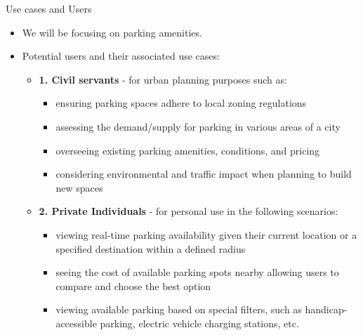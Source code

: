 \documentclass{beamer}
\begin{document}
\begin{frame}{Use cases and Users}
    \begin{itemize}
        \item We will be focusing on parking amenities.
        \item Potential users and their associated use cases:
        \begin{itemize}
            \item \textbf{1. Civil servants} - for urban planning purposes such as:
            \begin{itemize}
                \item ensuring parking spaces adhere to local zoning regulations
                \item assessing the demand/supply for parking in various areas of a city
                \item overseeing existing parking amenities, conditions, and pricing
                \item considering environmental and traffic impact when planning to build new spaces
            \end{itemize}
            \item \textbf{2. Private Individuals} - for personal use in the following scenarios:
            \begin{itemize}
                \item viewing real-time parking availability given their current location or a specified destination within a defined radius
                \item seeing the cost of available parking spots nearby allowing users to compare and choose the best option
                \item viewing available parking based on special filters, such as handicap-accessible parking, electric vehicle charging stations, etc.
            \end{itemize}
        \end{itemize}
    \end{itemize}
\end{frame}
\end{document}
